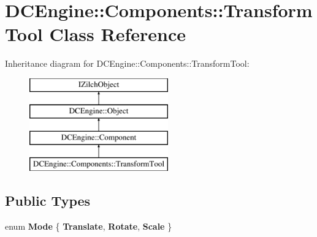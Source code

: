 \hypertarget{classDCEngine_1_1Components_1_1TransformTool}{\section{D\-C\-Engine\-:\-:Components\-:\-:Transform\-Tool Class Reference}
\label{classDCEngine_1_1Components_1_1TransformTool}
}
Inheritance diagram for D\-C\-Engine\-:\-:Components\-:\-:Transform\-Tool\-:\begin{figure}[H]
\begin{center}
\leavevmode
\includegraphics[height=4.000000cm]{classDCEngine_1_1Components_1_1TransformTool}
\end{center}
\end{figure}
\subsection*{Public Types}
\begin{DoxyCompactItemize}
\item 
enum {\bfseries Mode} \{ {\bfseries Translate}, 
{\bfseries Rotate}, 
{\bfseries Scale}
 \}
\end{DoxyCompactItemize}
